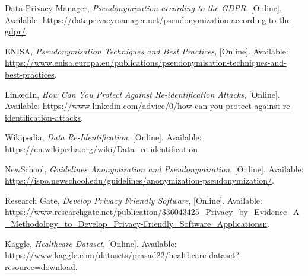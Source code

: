 
\begin{thebibliography}{9}

  Data Privacy Manager,
  \textit{Pseudonymization according to the GDPR},
  [Online]. Available: \url{https://dataprivacymanager.net/pseudonymization-according-to-the-gdpr/}. 

  ENISA,
  \textit{Pseudonymisation Techniques and Best Practices},
  [Online]. Available: \url{https://www.enisa.europa.eu/publications/pseudonymisation-techniques-and-best-practices}.

  LinkedIn,
  \textit{How Can You Protect Against Re-identification Attacks},
  [Online]. Available: \url{  https://www.linkedin.com/advice/0/how-can-you-protect-against-re-identification-attacks}.

  Wikipedia,
  \textit{Data Re-Identification},
  [Online]. Available: \url{https://en.wikipedia.org/wiki/Data_re-identification}.

  NewSchool,
  \textit{Guidelines Anonymization and Pseudonymization},
  [Online]. Available: \url{https://ispo.newschool.edu/guidelines/anonymization-pseudonymization/}.

  Research Gate,
  \textit{Develop Privacy Friendly Software},
  [Online]. Available: \url{https://www.researchgate.net/publication/336043425_Privacy_by_Evidence_A_Methodology_to_Develop_Privacy-Friendly_Software_Applicationsn}.

  Kaggle,
  \textit{Healthcare Dataset},
  [Online]. Available: \url{https://www.kaggle.com/datasets/prasad22/healthcare-dataset?resource=download}.
  
\end{thebibliography}